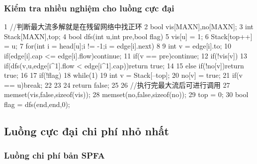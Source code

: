 \documentclass[11pt]{article}
\begin{document}
\subsubsection{Kiểm tra nhiều nghiệm cho luồng cực đại}

\begin{Code}
 1   //判断最大流多解就是在残留网络中找正环
 2   bool vis[MAXN],no[MAXN];
 3   int Stack[MAXN],top;
 4   bool dfs(int u,int pre,bool flag){
 5       vis[u] = 1;
 6       Stack[top++] = u;
 7       for(int i = head[u];i != -1;i = edge[i].next)
 8       {
 9           int v = edge[i].to;
10           if(edge[i].cap <= edge[i].flow)continue;
11           if(v == pre)continue;
12           if(!vis[v]){
13               if(dfs(v,u,edge[i^1].flow < edge[i^1].cap))return true;
14           }
15           else if(!no[v])return true;
16       }
17       if(!flag){
18           while(1){
19               int v = Stack[--top];
20               no[v] = true;
21               if(v == u)break;
22           }
23       }
24       return false;
25   }
26   //执行完最大流后可进行调用
27           memset(vis,false,sizeof(vis));
28           memset(no,false,sizeof(no));
29           top = 0;
30           bool flag = dfs(end,end,0);
\end{Code}

\subsection{Luồng cực đại chi phí nhỏ nhất}

\subsubsection{Luồng chi phí bản SPFA}
\end{document}
